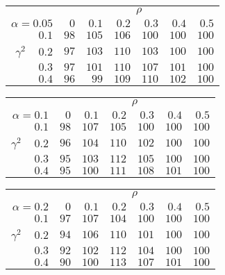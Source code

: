 \begin{tabular}{r|rrrrrr}
\hline\hline
 &\multicolumn{6}{c}{$\rho$} \\ 
 $\alpha = 0.05$ & $0$ & $0.1$ & $0.2$ & $0.3$ & $0.4$ & $0.5$ \\ 
 \hline$0.1$ & $ 98$ & $105$ & $106$ & $100$ & $100$ & $100$\\ 
$\gamma^2\;\;\;$ $0.2$ & $ 97$ & $103$ & $110$ & $103$ & $100$ & $100$\\ 
$0.3$ & $ 97$ & $101$ & $110$ & $107$ & $101$ & $100$\\ 
$0.4$ & $ 96$ & $ 99$ & $109$ & $110$ & $102$ & $100$\\ 
 \hline 
 \end{tabular}
 
 \vspace{2em} 
 
\begin{tabular}{r|rrrrrr}
\hline\hline
 &\multicolumn{6}{c}{$\rho$} \\ 
 $\alpha = 0.1$ & $0$ & $0.1$ & $0.2$ & $0.3$ & $0.4$ & $0.5$ \\ 
 \hline$0.1$ & $ 98$ & $107$ & $105$ & $100$ & $100$ & $100$\\ 
$\gamma^2\;\;\;$ $0.2$ & $ 96$ & $104$ & $110$ & $102$ & $100$ & $100$\\ 
$0.3$ & $ 95$ & $103$ & $112$ & $105$ & $100$ & $100$\\ 
$0.4$ & $ 95$ & $100$ & $111$ & $108$ & $101$ & $100$\\ 
 \hline 
 \end{tabular}
 
 \vspace{2em} 
 
\begin{tabular}{r|rrrrrr}
\hline\hline
 &\multicolumn{6}{c}{$\rho$} \\ 
 $\alpha = 0.2$ & $0$ & $0.1$ & $0.2$ & $0.3$ & $0.4$ & $0.5$ \\ 
 \hline$0.1$ & $ 97$ & $107$ & $104$ & $100$ & $100$ & $100$\\ 
$\gamma^2\;\;\;$ $0.2$ & $ 94$ & $106$ & $110$ & $101$ & $100$ & $100$\\ 
$0.3$ & $ 92$ & $102$ & $112$ & $104$ & $100$ & $100$\\ 
$0.4$ & $ 90$ & $100$ & $113$ & $107$ & $101$ & $100$\\ 
 \hline 
 \end{tabular}